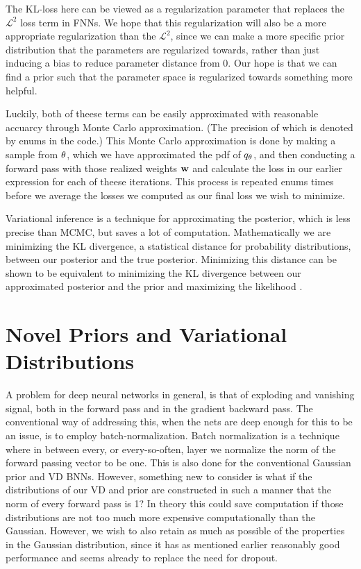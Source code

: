 \documentclass[nofootinbib,UKenglish,nobalancelastpage,12pt]{article}
\newcommand{\vect}{\ensuremath{\mathbf}}
\begin{document}
The KL-loss here can be viewed as a regularization parameter that replaces the $\mathcal{L}^2$ loss term in FNNs. We hope that this regularization will also be a more appropriate regularization than the $\mathcal{L}^2$, since we can make a more specific prior distribution that the parameters are regularized towards, rather than just inducing a bias to reduce parameter distance from 0. Our hope is that we can find a prior such that the parameter space is regularized towards something more helpful.

Luckily, both of theese terms can be easily approximated with reasonable accuarcy through Monte Carlo approximation. (The precision of which is denoted by enums in the code.) This Monte Carlo approximation is done by making a sample from $\vect{\theta}$, which we have approximated the pdf of $q_{\vect{\theta}}$, and then conducting a forward pass with those realized weights $\vect{w}$ and calculate the loss in our earlier expression for each of theese iterations. This process is repeated enums times before we average the losses we computed as our final loss we wish to minimize.


Variational inference is a technique for approximating the posterior, which is less precise than MCMC, but saves a lot of computation. Mathematically we are minimizing the KL divergence, a statistical distance for probability distributions, between our posterior and the true posterior. Minimizing this distance can be shown to be equivalent to minimizing the KL divergence between our approximated posterior and the prior and maximizing the likelihood \cite{VI_paper}. 
\clearpage
\section{Novel Priors and Variational Distributions}

A problem for deep neural networks in general, is that of exploding and vanishing signal, both in the forward pass and in the gradient backward pass. The conventional way of addressing this, when the nets are deep enough for this to be an issue, is to employ batch-normalization. Batch normalization\cite{Batch_Norm_original} is a technique where in between every, or every-so-often, layer we normalize the norm of the forward passing vector to be one. This is also done for the conventional Gaussian prior and VD BNNs. However, something new to consider is what if the distributions of our VD and prior are constructed in such a manner that the norm of every forward pass is 1? In theory this could save computation if those distributions are not too much more expensive computationally than the Gaussian. However, we wish to also retain as much as possible of the properties in the Gaussian distribution, since it has as mentioned earlier reasonably good performance and seems already to replace the need for dropout. 
\end{document}

